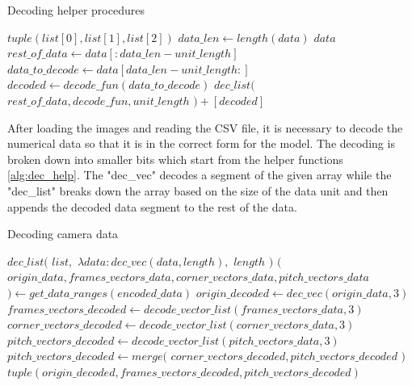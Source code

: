 \documentclass[
    11pt,
    oneside
]{report}
\begin{document}
\begin{algorithm}[H]
\begin{algorithmic}
\caption{Decoding helper procedures}\label{alg:dec_help}
    \Return $tuple(list[0], list[1], list[2])$
\EndProcedure
{}
    \State
    $data\_len \gets length(data)$
        \Return $data$
    \EndIf
    \State $rest\_of\_data \gets data[:data\_len - unit\_length]$
    \State $data\_to\_decode \gets data[data\_len - unit\_length:]$
    \State $decoded \gets decode\_fun(data\_to\_decode)$
    \State
    \Return $dec\_list($
            \State \indent $rest\_of\_data,decode\_fun,unit\_length$
    \State $) + [decoded]$
\EndProcedure
\end{algorithmic}
\end{algorithm}


After loading the images and reading the CSV file, it is necessary to decode the numerical data so that it is in the correct form for the model. The decoding is broken down into smaller bits which start from the helper functions \ref{alg:dec_help}. The "dec\_vec" decodes a segment of the given array while the "dec\_list" breaks down the array based on the size of the data unit and then appends the decoded data segment to the rest of the data.





\begin{algorithm}[H]
\begin{algorithmic}
\caption{Decoding camera data}\label{alg:dec_data}
    \Return $dec\_list($
        \State \indent $list,$
        \State \indent $\lambda data: dec\_vec(data, length),$
        \State \indent $length$
    \State $)$
\EndProcedure
{}
    \State $($
    \State \indent $origin\_data, frames\_vectors\_data, corner\_vectors\_data, pitch\_vectors\_data$
    \State $) \gets get\_data\_ranges(encoded\_data)$
    \State $origin\_decoded \gets dec\_vec(origin\_data, 3)$
    \State $frames\_vectors\_decoded \gets decode\_vector\_list(frames\_vectors\_data, 3)$
    \State $corner\_vectors\_decoded \gets decode\_vector\_list(corner\_vectors\_data, 3)$
    \State $pitch\_vectors\_decoded \gets decode\_vector\_list(pitch\_vectors\_data, 3)$
    \State $pitch\_vectors\_decoded \gets merge($
        \State \indent $corner\_vectors\_decoded, pitch\_vectors\_decoded$
    \State $)$
    \State
    \Return $tuple(origin\_decoded, frames\_vectors\_decoded, pitch\_vectors\_decoded)$
\EndProcedure
\end{algorithmic}
\end{algorithm}
\end{document}
